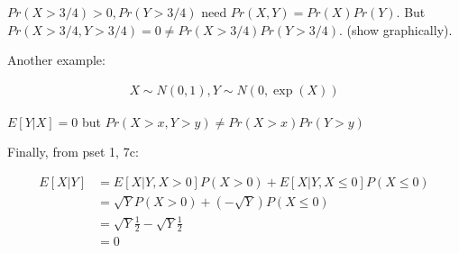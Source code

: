 \documentclass{exam}
\begin{document}
\begin{questions}
    $Pr(X > 3/4) > 0, Pr(Y > 3/4)$ need $Pr(X, Y) = Pr(X)Pr(Y)$.
    But $Pr(X > 3/4, Y > 3/4) = 0 \neq Pr(X > 3/4)Pr(Y > 3/4)$. (show graphically).


    Another example:

    \begin{align*}
        X \sim  N(0, 1), Y \sim N(0, \exp(X))
    \end{align*}

    $E[Y | X] = 0$ but $Pr(X > x, Y > y) \neq Pr(X > x) Pr(Y > y)$


    Finally, from pset 1, 7c:

        \begin{align*}
            E[X\vert Y] & = E[X\vert Y, X > 0] P(X > 0) + E[X\vert Y, X \leq 0] P(X \leq 0) \\
            & =  \sqrt{Y} P(X > 0) +\left(-\sqrt{Y}\right) P(X \leq 0) \\
            & =  \sqrt{Y} \frac{1}{2} -\sqrt{Y} \frac{1}{2} \\
            &=0
        \end{align*}
\end{questions}
\end{document}
